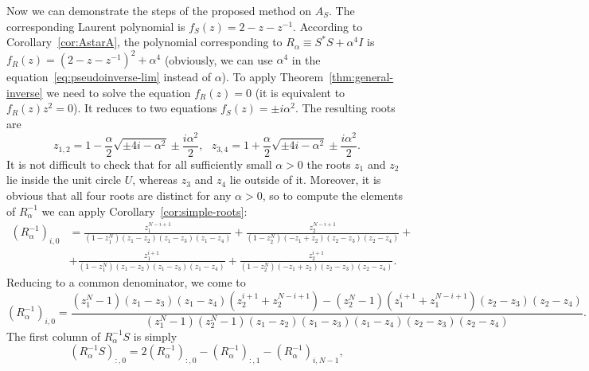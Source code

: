 \documentclass[a4paper]{article}
\newcommand{\lap}{A_S}
\newcommand{\stiffnessQ}{R}
\begin{document}
	Now we can demonstrate the steps of the proposed method on $\lap$.
	The corresponding Laurent polynomial is $f_S(z) = 2 - z-z^{-1}$.
	According to Corollary~\ref{cor:AstarA}, the polynomial corresponding to $\stiffnessQ_{\alpha} \equiv S^*S + \alpha^4 I$ is $f_\stiffnessQ(z) = (2-z-z^{-1})^2 + \alpha^4$
	(obviously, we can use $\alpha^4$ in the equation~\eqref{eq:pseudoinverse-lim} instead of $\alpha$).
	To apply Theorem~\ref{thm:general-inverse} we need to solve the equation $f_\stiffnessQ(z) = 0$ (it is equivalent to $f_\stiffnessQ(z)z^2 = 0$).
	It reduces to two equations $f_S(z) = \pm i\alpha^2$.
	The resulting roots are 
	\[
	z_{1,2} = 1 - \frac{\alpha}{2}\sqrt{\pm 4i - \alpha^2} \pm \frac{i\alpha^2}{2},~~~z_{3,4} = 1 + \frac{\alpha}{2}\sqrt{\pm 4i -\alpha^2} \pm \frac{i\alpha^2}{2}.
	\]
	It is not difficult to check that for all sufficiently small $\alpha > 0$ the roots $z_1$ and $z_2$ lie inside the unit circle $U$, whereas $z_3$ and $z_4$ lie outside of it.
	Moreover, it is obvious that all four roots are distinct for any $\alpha > 0$, so to compute the elements of $\stiffnessQ_{\alpha}^{-1}$ we can apply Corollary~\ref{cor:simple-roots}:
	\begin{align*}
	(\stiffnessQ_\alpha^{-1})_{i,0} &= 
		\frac{z_{1}^{N - i + 1}}{\left(1 - z_{1}^{N}\right) \left(z_{1} - z_{2}\right) \left(z_{1} - z_{3}\right) \left(z_{1} - z_{4}\right)}
	+
	\frac{z_{2}^{N - i + 1}}{\left(1 - z_{2}^{N}\right) \left(- z_{1} + z_{2}\right) \left(z_{2} - z_{3}\right) \left(z_{2} - z_{4}\right)}
	+\\&+
	\frac{z_{1}^{i + 1}}{\left(1 - z_{1}^{N}\right) \left(z_{1} - z_{2}\right) \left(z_{1} - z_{3}\right) \left(z_{1} - z_{4}\right)}
	+
	\frac{z_{2}^{i + 1}}{\left(1 - z_{2}^{N}\right) \left(- z_{1} + z_{2}\right) \left(z_{2} - z_{3}\right) \left(z_{2} - z_{4}\right)}.
    \end{align*}
    Reducing to a common denominator, we come to 
    \[
    (\stiffnessQ_\alpha^{-1})_{i,0}
    =
    \frac
    {\left(z_{1}^{N} - 1\right)\left(z_{1} - z_{3}\right) \left(z_{1} - z_{4}\right)  \left(z_{2}^{i + 1} + z_{2}^{N - i + 1}\right)
    -
    \left(z_{2}^{N} - 1\right)\left(z_{1}^{i + 1} + z_{1}^{N - i + 1}\right) \left(z_{2} - z_{3}\right) \left(z_{2} - z_{4}\right) }
    {\left(z_{1}^{N} - 1\right) \left(z_{2}^{N} - 1\right) \left(z_{1} - z_{2}\right) \left(z_{1} - z_{3}\right) \left(z_{1} - z_{4}\right) \left(z_{2} - z_{3}\right) \left(z_{2} - z_{4}\right) }.
    \]
    The first column of $\stiffnessQ_\alpha^{-1}S$ is simply
    \[
    (\stiffnessQ_\alpha^{-1}S)_{:,0} = 2(\stiffnessQ_\alpha^{-1})_{:,0} - (\stiffnessQ_\alpha^{-1})_{:,1} - (\stiffnessQ_\alpha^{-1})_{i,N-1},
    \]
\end{document}

